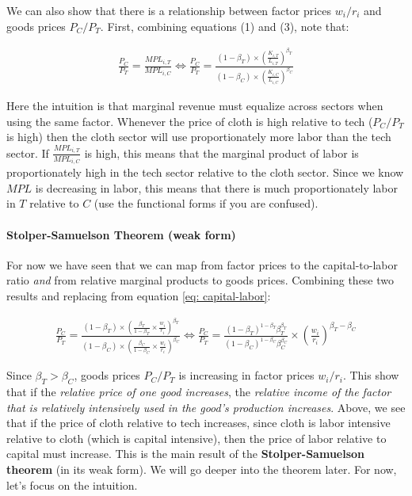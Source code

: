 \documentclass[11pt,letterpaper]{article}
\begin{document}
We can also show that there is a relationship between factor prices $w_i / r_i$ and goods prices $P_C / P_T$. First, combining equations (1) and (3), note that:

\begin{eqnarray}
    \frac{P_C}{P_T} = \frac{MPL_{i,T}}{MPL_{i,C}} \iff 
    \frac{P_C}{P_T} = \frac{(1-\beta_T) \times \left( \frac{K_{i,T}}{L_{i,T}} \right)^{\beta_T}}{ (1-\beta_C) \times \left( \frac{K_{i,C}}{L_{i,C}} \right)^{\beta_C}}  
\end{eqnarray}

Here the intuition is that marginal revenue must equalize across sectors when using the same factor. Whenever the price of cloth is high relative to tech ($P_C/P_T$ is high) then the cloth sector will use proportionately more labor than the tech sector. If $\frac{MPL_{i,T}}{MPL_{i,C}}$ is high, this means that the marginal product of labor is proportionately high in the tech sector relative to the cloth sector. Since we know $MPL$ is decreasing in labor, this means that there is much proportionately labor in $T$ relative to $C$ (use the functional forms if you are confused).

\paragraph{Stolper-Samuelson Theorem (weak form)} For now we have seen that we can map from factor prices to the capital-to-labor ratio \textit{and} from relative marginal products to goods prices. Combining these two results and replacing from equation \eqref{eq: capital-labor}:

\begin{eqnarray}\label{eq: goods-factor-prices}
    \frac{P_C}{P_T} = \frac{(1-\beta_T) \times \left( \frac{\beta_T}{1-\beta_T} \times \frac{w_i}{r_i}  \right)^{\beta_T}}{ (1-\beta_C) \times \left( \frac{\beta_C}{1-\beta_C} \times \frac{w_i}{r_i} \right)^{\beta_C}} \iff \frac{P_C}{P_T} = \frac{(1-\beta_T)^{1-\beta_T} \beta_T^{\beta_T}}{ (1-\beta_C)^{1-\beta_C} \beta_C^{\beta_C} } \times \left(  \frac{w_i}{r_i} \right)^{\beta_T - \beta_C}
\end{eqnarray} 

Since $\beta_T > \beta_C$, goods prices $P_C/P_T$ is increasing in factor prices $w_i/r_i$. This show that if the \textit{relative price of one good increases}, the \textit{relative income of the factor that is relatively intensively used in the good’s production increases}. Above, we see that if the price of cloth relative to tech increases, since cloth is labor intensive relative to cloth (which is capital intensive), then the price of labor relative to capital must increase. This is the main result of the \textbf{Stolper-Samuelson theorem} (in its weak form). We will go deeper into the theorem later. For now, let's focus on the intuition.
\end{document}
